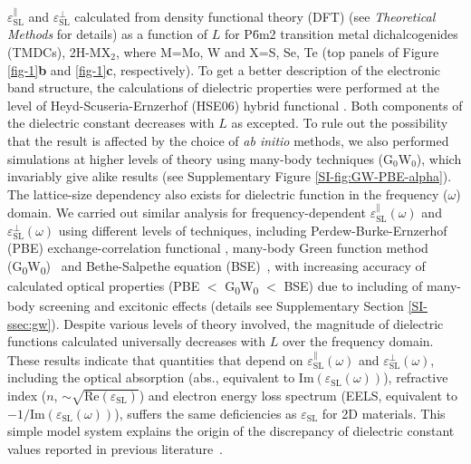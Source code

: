 $\varepsilon^{\parallel}_{\mathrm{SL}}$ and
$\varepsilon^{\perp}_{\mathrm{SL}}$ calculated from density functional
theory (DFT) (see {\itshape Theoretical Methods} for details) as a function
of $L$ for P\={6}m2 transition metal dichalcogenides (TMDCs),
2H-MX$_{2}$, where M=Mo, W and X=S, Se, Te (top panels of Figure
\ref{fig-1}{\textbf b} and \ref{fig-1}{\textbf c}, respectively). To
get a better description of the electronic band structure, the
calculations of dielectric properties were performed at the level of
Heyd-Scuseria-Ernzerhof (HSE06) hybrid functional
\cite{Heyd_2003,Heyd_2006}.  Both components of the dielectric
constant decreases with $L$ as excepted. To rule out the possibility
that the result is affected by the choice of \textit{ab initio}
methods, we also performed simulations at higher levels of theory
using many-body techniques (G$_{0}$W$_{0}$), which invariably give
alike results (see Supplementary Figure \ref{SI-fig:GW-PBE-alpha}).
The lattice-size dependency also exists for dielectric function in the
frequency ($\omega$) domain. We carried out similar analysis for
frequency-dependent $\varepsilon^{\parallel}_{\mathrm{SL}}(\omega)$
and $\varepsilon^{\perp}_{\mathrm{SL}}(\omega)$ using different levels
of techniques, including Perdew-Burke-Ernzerhof (PBE)
exchange-correlation functional
\cite{Perdew_1996,Ernzerhof_1999,Paier_2005}, many-body Green function
method (G\textsubscript{0}W\textsubscript{0})~\cite{Hedin_1965} and
Bethe-Salpethe equation (BSE)~\cite{Onida_2002}, with increasing
accuracy of calculated optical properties (PBE $<$
G\textsubscript{0}W\textsubscript{0} $<$ BSE) due to including of
many-body screening and excitonic effects (details see Supplementary
Section \ref{SI-ssec:gw}). Despite various levels of theory involved,
the magnitude of dielectric functions calculated universally decreases
with $L$ over the frequency domain.  These results indicate that
quantities that depend on
$\varepsilon^{\parallel}_{\mathrm{SL}}(\omega)$ and
$\varepsilon^{\perp}_{\mathrm{SL}}(\omega)$, including the optical
absorption (abs., equivalent to $\mathrm{Im}(\varepsilon_{\mathrm{SL}}(\omega))$), refractive index ($n$,  $\sim{}\sqrt{\mathrm{Re}(\varepsilon_{\mathrm{SL}})}$) and electron energy loss spectrum (EELS, equivalent to $-1 / \mathrm{Im}(\varepsilon_{\mathrm{SL}}(\omega))$), suffers the same
deficiencies as $\varepsilon_{\mathrm{SL}}$ for 2D materials. This
simple model system explains the origin of the discrepancy of
dielectric constant values reported in previous
literature~\cite{Li_2016}.
%
%
%
%
%

